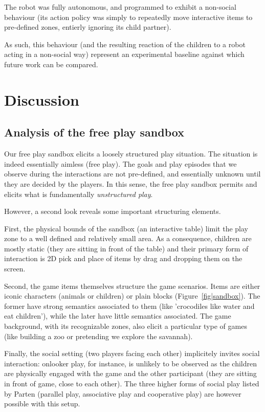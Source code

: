 \documentclass{article}
\begin{document}
The robot was fully autonomous, and programmed to exhibit a non-social behaviour
(its action policy was simply to repeatedly move interactive items to
pre-defined zones, entierly ignoring its child partner).

As such, this behaviour (and the resulting reaction of the children to a
robot acting in a non-social way) represent an experimental baseline against which
future work can be compared.

\section{Discussion}

\subsection{Analysis of the free play sandbox}

Our free play sandbox elicits a loosely structured play situation. The
situation is indeed essentially aimless (free play). The goals and play episodes
that we observe during the interactions are not pre-defined, and essentially
unknown until they are decided by the players. In this sense, the free play
sandbox permits and elicits what is fundamentally \emph{unstructured play}.

However, a second look reveals some important structuring elements.

First, the physical bounds of the sandbox (an interactive table) limit the
play zone to a well defined and relatively small area. As a consequence,
children are mostly static (they are sitting in front of the table) and their
primary form of interaction is 2D pick and place of items by drag and dropping
them on the screen.

Second, the game items themselves structure the game scenarios. Items are either
iconic characters (animals or children) or plain blocks
(Figure~\ref{fig|sandbox}). The former have strong semantics associated to them
(like 'crocodiles like water and eat children'), while the later have little
semantics associated. The game background, with its recognizable zones, also
elicit a particular type of games (like building a zoo or pretending we explore
the savannah).

Finally, the social setting (two players facing each other) implicitely invites
social interaction: onlooker play, for instance, is unlikely to be observed as
the children are physically engaged with the game and the other participant
(they are sitting in front of game, close to each other). The three higher forms
of social play listed by Parten (parallel play, associative play and cooperative
play) are however possible with this setup.
\end{document}
